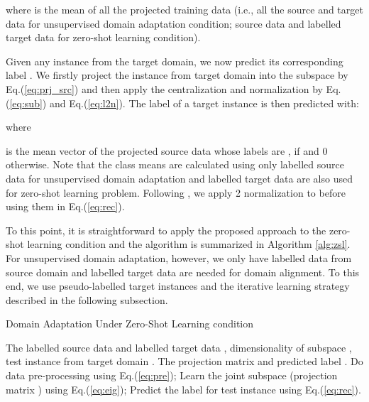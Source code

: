 \documentclass[conference]{IEEEtran}
\begin{document}
where  is the mean of all the projected training data (i.e., all the source and target data for unsupervised domain adaptation condition; source data and labelled target data for zero-shot learning condition).

Given any instance  from the target domain, we now predict its corresponding label . We firstly project the instance from target domain into the subspace by Eq.(\ref{eq:prj_src}) and then apply the centralization and normalization by Eq.(\ref{eq:sub}) and Eq.(\ref{eq:l2n}).
The label of a target instance is then predicted with:

where 

is the mean vector of the projected source data whose labels are ,  if  and 0 otherwise. Note that the class means  are calculated using only labelled source data for unsupervised domain adaptation and labelled target data are also used for zero-shot learning problem. Following \cite{wang2017zero}, we apply 2 normalization to  before using them in Eq.(\ref{eq:rec}).

To this point, it is straightforward to apply the proposed approach to the zero-shot learning condition and the algorithm is summarized in Algorithm \ref{alg:zsl}. For unsupervised domain adaptation, however, we only have labelled data from source domain and labelled target data are needed for domain alignment. To this end, we use pseudo-labelled target instances and the iterative learning strategy described in the following subsection.

\begin{algorithm}[tb]
	\caption{Domain Adaptation Under Zero-Shot Learning condition}
	\label{alg:zsl}
\renewcommand{\algorithmicrequire}{\textbf{Input:}}
	\renewcommand{\algorithmicensure}{\textbf{Output:}}
	\begin{algorithmic}[1]
		\REQUIRE The labelled source data  and labelled target data , dimensionality of subspace , test instance from target domain .
		\ENSURE The projection matrix  and predicted label .
		\STATE Do data pre-processing using Eq.(\ref{eq:pre});
		\STATE Learn the joint subspace (projection matrix ) using Eq.(\ref{eq:eig});
		\STATE Predict the label  for test instance  using Eq.(\ref{eq:rec}).
	\end{algorithmic}
\end{algorithm}
\end{document}
